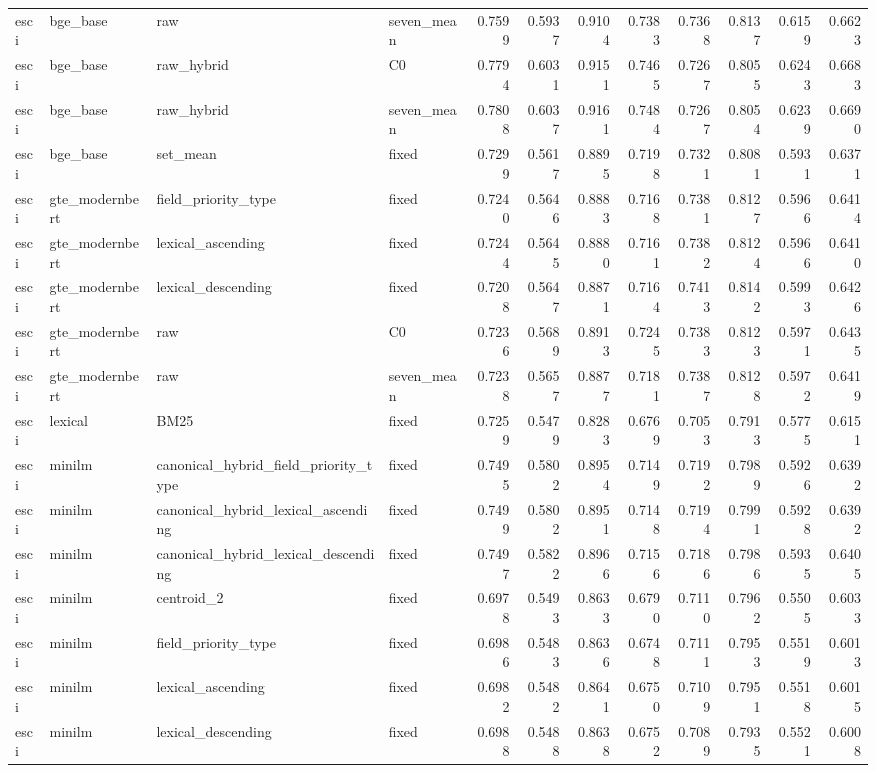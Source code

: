 \begin{longtable}{llllrrrrrrrr}
esci & bge\_base & raw & seven\_mean & 0.7599 & 0.5937 & 0.9104 & 0.7383 & 0.7368 & 0.8137 & 0.6159 & 0.6623 \\
esci & bge\_base & raw\_hybrid & C0 & 0.7794 & 0.6031 & 0.9151 & 0.7465 & 0.7267 & 0.8055 & 0.6243 & 0.6683 \\
esci & bge\_base & raw\_hybrid & seven\_mean & 0.7808 & 0.6037 & 0.9161 & 0.7484 & 0.7267 & 0.8054 & 0.6239 & 0.6690 \\
esci & bge\_base & set\_mean & fixed & 0.7299 & 0.5617 & 0.8895 & 0.7198 & 0.7321 & 0.8081 & 0.5931 & 0.6371 \\
esci & gte\_modernbert & field\_priority\_type & fixed & 0.7240 & 0.5646 & 0.8883 & 0.7168 & 0.7381 & 0.8127 & 0.5966 & 0.6414 \\
esci & gte\_modernbert & lexical\_ascending & fixed & 0.7244 & 0.5645 & 0.8880 & 0.7161 & 0.7382 & 0.8124 & 0.5966 & 0.6410 \\
esci & gte\_modernbert & lexical\_descending & fixed & 0.7208 & 0.5647 & 0.8871 & 0.7164 & 0.7413 & 0.8142 & 0.5993 & 0.6426 \\
esci & gte\_modernbert & raw & C0 & 0.7236 & 0.5689 & 0.8913 & 0.7245 & 0.7383 & 0.8123 & 0.5971 & 0.6435 \\
esci & gte\_modernbert & raw & seven\_mean & 0.7238 & 0.5657 & 0.8877 & 0.7181 & 0.7387 & 0.8128 & 0.5972 & 0.6419 \\
esci & lexical & BM25 & fixed & 0.7259 & 0.5479 & 0.8283 & 0.6769 & 0.7053 & 0.7913 & 0.5775 & 0.6151 \\
esci & minilm & canonical\_hybrid\_field\_priority\_type & fixed & 0.7495 & 0.5802 & 0.8954 & 0.7149 & 0.7192 & 0.7989 & 0.5926 & 0.6392 \\
esci & minilm & canonical\_hybrid\_lexical\_ascending & fixed & 0.7499 & 0.5802 & 0.8951 & 0.7148 & 0.7194 & 0.7991 & 0.5928 & 0.6392 \\
esci & minilm & canonical\_hybrid\_lexical\_descending & fixed & 0.7497 & 0.5822 & 0.8966 & 0.7156 & 0.7186 & 0.7986 & 0.5935 & 0.6405 \\
esci & minilm & centroid\_2 & fixed & 0.6978 & 0.5493 & 0.8633 & 0.6790 & 0.7110 & 0.7962 & 0.5505 & 0.6033 \\
esci & minilm & field\_priority\_type & fixed & 0.6986 & 0.5483 & 0.8636 & 0.6748 & 0.7111 & 0.7953 & 0.5519 & 0.6013 \\
esci & minilm & lexical\_ascending & fixed & 0.6982 & 0.5482 & 0.8641 & 0.6750 & 0.7109 & 0.7951 & 0.5518 & 0.6015 \\
esci & minilm & lexical\_descending & fixed & 0.6988 & 0.5488 & 0.8638 & 0.6752 & 0.7089 & 0.7935 & 0.5521 & 0.6008 \\

\end{longtable}
